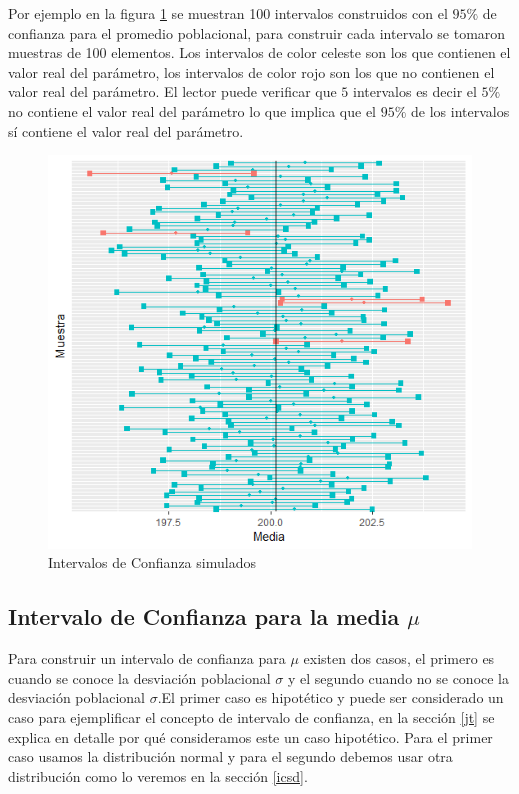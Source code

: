 \documentclass[]{book}
\begin{document}
Por ejemplo en la figura \ref{fig:ic} se muestran 100 intervalos
construidos con el \(95 \%\) de confianza para el promedio poblacional,
para construir cada intervalo se tomaron muestras de 100 elementos. Los
intervalos de color celeste son los que contienen el valor real del
parámetro, los intervalos de color rojo son los que no contienen el
valor real del parámetro. El lector puede verificar que \(5\) intervalos
es decir el \(5 \%\) no contiene el valor real del parámetro lo que
implica que el \(95 \%\) de los intervalos sí contiene el valor real del
parámetro.

\begin{figure}[h]

{\centering \includegraphics[width=0.7\linewidth]{ic} 

}

\caption{Intervalos de Confianza simulados}\label{fig:ic}
\end{figure}

\subsection{\texorpdfstring{Intervalo de Confianza para la media
\(\mu\)}{Intervalo de Confianza para la media \textbackslash{}mu}}\label{intervalo-de-confianza-para-la-media-mu}

Para construir un intervalo de confianza para \(\mu\) existen dos casos,
el primero es cuando se conoce la desviación poblacional \(\sigma\) y el
segundo cuando no se conoce la desviación poblacional \(\sigma\).El
primer caso es hipotético y puede ser considerado un caso para
ejemplificar el concepto de intervalo de confianza, en la sección
\ref{jt} se explica en detalle por qué consideramos este un caso
hipotético. Para el primer caso usamos la distribución normal y para el
segundo debemos usar otra distribución como lo veremos en la sección
\ref{icsd}.
\end{document}
